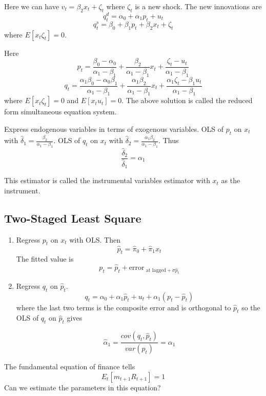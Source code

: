 \documentclass[11pt, a4paper, oneside]{article}
\theoremstyle{definition}
\theoremstyle{proposition}
\theoremstyle{corollary}
\theoremstyle{lemma}
\theoremstyle{theorem}
\begin{document}
Here we can have $v_t = \beta_2x_t +\zeta_t$ where $\zeta_t$ is a new shock. The new innovations are
$$q_t^d = \alpha_0 + \alpha_1 p_t + u_t$$
$$q_t^s = \beta_0 + \beta_1 p_t + \beta_2 x_t + \zeta_t$$ where $E[x_t \zeta_t] = 0$. 

Here $$p_t = \frac{\beta_0 -\alpha_0}{\alpha_1- \beta_1} + \frac{\beta_2}{\alpha_1 - \beta_1} x_t + \frac{\zeta_t - u_t}{\alpha_1 -\beta_1}$$
$$q_t =\frac{\alpha_1 \beta_0 - \alpha_0\beta_1}{\alpha_1 - \beta_1} + \frac{\alpha_1\beta_2}{\alpha_1 - \beta_1}x_t + \frac{\alpha_1 \zeta_t - \beta_1 u_t}{\alpha_1 - \beta_1}$$ 
where $E[x_t\zeta_t] = 0$ and $E[x_tu_t] = 0$. The above solution is called the reduced form simultaneous equation system. 

Express endogenous variables in terms of exogenous variables. OLS of $p_t$ on $x_t$ with $\hat{\delta}_1 = \frac{\beta_2}{\alpha_1 - \beta_1}$. OLS of $q_t$ on $x_t$ with $\hat{\delta}_2 = \frac{\alpha_1 \beta_2}{\alpha_1 - \beta_1}$. Thus
$$\frac{\hat{\delta}_2}{\hat{\delta}_1} = \alpha_1$$

This estimator is called the instrumental variables estimator with $x_t$ as the  instrument. 

\subsection{Two-Staged Least Square}
\begin{enumerate}
\item Regress $p_t$ on $x_t$ with OLS. Then
$$\hat{p}_t = \hat{\pi}_0 + \hat{\pi}_1 x_t$$ 
The fitted value is $$p_t = \hat{p}_t + \text{error}_{\text{ at lagged} + \sigma\hat{p}_t}$$
\item Regress $q_t$ on $\hat{p}_t$. 
$$q_t = \alpha_0 + \alpha_1 \hat{p}_t + u_t + \alpha_1(p_t -\hat{p}_t)$$
where the last two terms is the composite error and is orthogonal to $\hat{p}_t$ so the OLS of $q_t$ on $\hat{p}_t$ gives 

$$\hat{\alpha}_1 = \frac{cov(q_t, \hat{p}_t)}{var(p_t)} = \alpha_1$$
\end{enumerate}
The fundamental equation of finance tells 
$$E_t[m_{t+1}R_{t+1}] = 1$$ 
Can we estimate the parameters in this equation?
\end{document}
